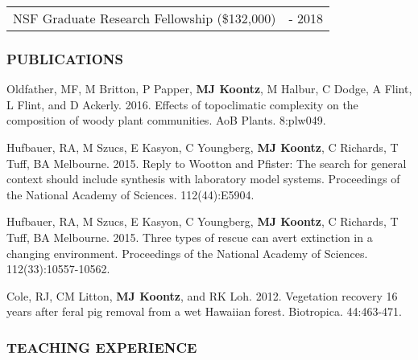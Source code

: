 \documentclass[11pt,english]{article}
\begin{document}
\begin{tabular}{>{\raggedright}p{5in}>{\raggedleft}p{1in}}
NSF Graduate Research Fellowship (\$132,000) & 2013 - 2018
\end{tabular}



\vspace{1.5ex}
\subsubsection*{PUBLICATIONS}
\vspace{-0.5ex}

\begin{hangparas}{.5in}{1}

\hspace{0.575em}Oldfather, MF, M Britton, P Papper, \textbf{MJ Koontz}, M Halbur, C Dodge, A Flint, L Flint, and D Ackerly. 2016. Effects of topoclimatic complexity on the composition of woody plant communities. AoB Plants. 8:plw049.

\hspace{0.575em}Hufbauer, RA, M Szucs, E Kasyon, C Youngberg, \textbf{MJ Koontz}, C Richards, T Tuff, BA Melbourne. 2015. Reply to Wootton and Pfister: The search for general context should include synthesis with laboratory model systems. Proceedings of the National Academy of Sciences. 112(44):E5904.

\hspace{0.575em}Hufbauer, RA, M Szucs, E Kasyon, C Youngberg, \textbf{MJ Koontz}, C Richards, T Tuff, BA Melbourne. 2015. Three types of rescue can avert extinction in a changing environment. Proceedings of the National Academy of Sciences. 112(33):10557-10562.

\hspace{0.575em}Cole, RJ, CM Litton, \textbf{MJ Koontz}, and RK
Loh. 2012. Vegetation recovery 16 years after feral pig removal from
a wet Hawaiian forest. Biotropica. 44:463-471.

\end{hangparas}
\vspace{1ex}


\vspace{1.5ex}
\subsubsection*{TEACHING EXPERIENCE}
\vspace{-0.5ex}
\end{document}
